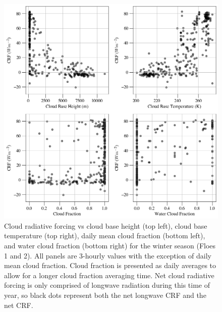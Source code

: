 \begin{figure}[p]
    \centering
    \includegraphics[width=1\linewidth]{figures/chapter4/VSWinter.png}
    \caption[Cloud radiative forcing vs cloud base height, cloud base temperature, cloud fraction, and water cloud fraction for winter.]{Cloud radiative forcing vs cloud base height (top left), cloud base temperature (top right), daily mean cloud fraction (bottom left), and water cloud fraction (bottom right) for the winter season (Floes 1 and 2). All panels are 3-hourly values with the exception of daily mean cloud fraction. Cloud fraction is presented as daily averages to allow for a longer cloud fraction averaging time. Net cloud radiative forcing is only comprised of longwave radiation during this time of year, so black dots represent both the net longwave CRF and the net CRF.}
    \label{fig:winter:crf}
\end{figure}

